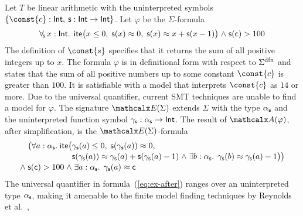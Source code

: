 
\begin{example}
\label{ex:translation}
Let $T$ be linear arithmetic with the uninterpreted symbols  $\{ \const{c} : { \typeint },\> \con{s} : { \typeint \rightarrow \typeint } \}$.
Let $\varphi$ be the $\Sigma$-formula
\begin{equation} \label{eq:ex-before}
\forallf{\con{s}} x : {\typeint}.\;\, \lite\bigl( x \leq 0,\; \con{s}(x) \teq 0,\;
  \con{s}( x ) \teq x + \con{s}( x - 1 ) \bigr) \wedge \con{s}( \con{c} ) > 100
\end{equation}
%
The definition of $\const{s}$ specifies that it returns the sum of all
positive integers up to $x$. The formula $\varphi$ is in definitional form with
respect to $\sfundefs{\Sigma}$ 
and states that the sum of all
positive numbers up to some constant $\const{c}$ is greater than $100$. It is
satisfiable with a model that interprets $\const{c}$ as $14$ or more.
Due to the universal quantifier,
current SMT techniques
are unable to find
a model for $\varphi$. The signature $\extendsig{\Sigma}$ extends $\Sigma$ with the type
$\alpha_{\mathsf{s}}$ and the uninterpreted function symbol $\gamma_{\mathsf{s}} : \alpha_{\mathsf{s}}
\rightarrow \mathsf{Int}$. The result of $\conv( \varphi )$, after simplification, 
is the $\extendsig{\Sigma}$-formula
%
\begin{equation} \label{eq:ex-after}
\!\begin{aligned}[c]
  & \phantom{{\wedge}\; }\bigl(
      \forall a : \fargtype{\con{s}}.\; \lite\bigl(
        \!\begin{aligned}[t]
         &  \farg{\con{s}}( a ) \leq 0,\;
          \con{s}(\farg{\con{s}}( a )) \teq 0,\;
\\[-\jot]
  & \con{s}(\farg{\con{s}}( a )) \teq \farg{\con{s}}( a ) + \con{s}( \farg{\con{s}}( a )-1 )
    \wedge \exists b : {\fargtype{\con{s}}}.\;\, \farg{\con{s}}( b ) \teq \farg{\con{s}}( a )-1 \bigr) \bigr)
\end{aligned}
\\[-\jot]
 & {\wedge}\; \con{s}( \con{c} ) > 100 \wedge \exists a : {\fargtype{\con{s}}}.\;\, \farg{\con{s}}( a ) \teq \con{c}
\end{aligned}
\end{equation}
%
The universal quantifier in formula~(\ref{eq:ex-after}) ranges over an uninterpreted
type $\alpha_{\mathsf{s}}$, making it amenable to the finite model finding
techniques by Reynolds et al.\ \cite{ReyEtAl-1-RR-13,reynolds-et-al-2013},

\end{example}
